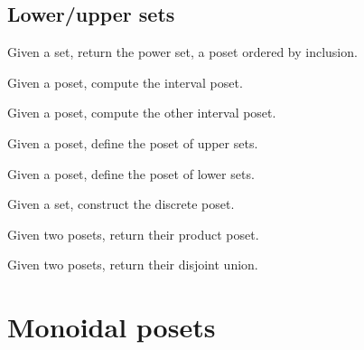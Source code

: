 \begin{exercise}
\subsection{Lower/upper sets}
\begin{exercise}
Given a set, return the power set, a poset ordered by inclusion.

\end{exercise}


\begin{exercise}
Given a poset, compute the interval poset.

\end{exercise}


\begin{exercise}
Given a poset, compute the other interval poset.

\end{exercise}


\begin{exercise}
Given a poset, define the poset of upper sets.

\end{exercise}

\begin{exercise}
Given a poset, define the poset of lower sets.
\end{exercise}


\begin{exercise}
Given a set, construct the discrete poset.

\end{exercise}


\begin{exercise}
Given two posets, return their product poset.
\end{exercise}
\begin{exercise}
Given two posets, return their disjoint union.

\end{exercise}


\section{Monoidal posets}



\end{exercise}
